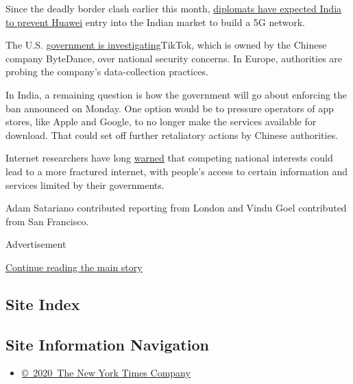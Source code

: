Since the deadly border clash earlier this month,
\href{https://www.nytimes.com/2020/06/19/world/asia/india-china-border.html}{diplomats
have expected India to prevent Huawei} entry into the Indian market to
build a 5G network.

The U.S.
\href{https://www.nytimes.com/2019/11/01/technology/tiktok-national-security-review.html}{government
is investigating}TikTok, which is owned by the Chinese company
ByteDance, over national security concerns. In Europe, authorities are
probing the company's data-collection practices.

In India, a remaining question is how the government will go about
enforcing the ban announced on Monday. One option would be to pressure
operators of app stores, like Apple and Google, to no longer make the
services available for download. That could set off further retaliatory
actions by Chinese authorities.

Internet researchers have long
\href{https://www.nytimes.com/2017/09/17/technology/facebook-government-regulations.html}{warned}
that competing national interests could lead to a more fractured
internet, with people's access to certain information and services
limited by their governments.

Adam Satariano contributed reporting from London and Vindu Goel
contributed from San Francisco.

Advertisement

\protect\hyperlink{after-bottom}{Continue reading the main story}

\hypertarget{site-index}{%
\subsection{Site Index}\label{site-index}}

\hypertarget{site-information-navigation}{%
\subsection{Site Information
Navigation}\label{site-information-navigation}}

\begin{itemize}
\tightlist
\item
  \href{https://help.nytimes.com/hc/en-us/articles/115014792127-Copyright-notice}{©~2020~The
  New York Times Company}
\end{itemize}

